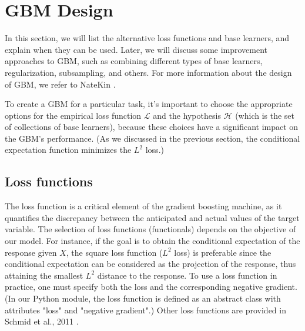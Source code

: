 \section{GBM Design}
In this section, we will list the alternative loss functions and base learners, and explain when they can be used. Later, we will discuss some improvement approaches to GBM, such as combining different types of base learners, regularization, subsampling, and others. For more information about the design of GBM, we refer  to NateKin \cite{natekin2013gradient}.

To create a GBM for a particular task, it's important to choose the appropriate options for the empirical loss function $\mathcal{L}$ and the hypothesis $\mathcal{H}$ (which is the set of collections of base learners), because these choices have a significant impact on the GBM's performance. (As we discussed in the previous section, the conditional expectation function minimizes the $L^2$ loss.)


\subsection{Loss functions}
The loss function is a critical element of the gradient boosting machine, as it quantifies the discrepancy between the anticipated and actual values of the target variable. The selection of loss functions (functionals) depends on the objective of our model. For instance, if the goal is to obtain the conditional expectation of the response given $X$, the square loss function ($L^2$ loss) is preferable since the conditional expectation can be considered as the projection of the response, thus attaining the smallest $L^2$ distance to the response. To use a loss function in practice, one must specify both the loss and the corresponding negative gradient. (In our Python module, the loss function is defined as an abstract class with attributes "loss" and "negative gradient".) Other loss functions are provided in Schmid et al., 2011 \cite{schmid2011geoadditive}.

